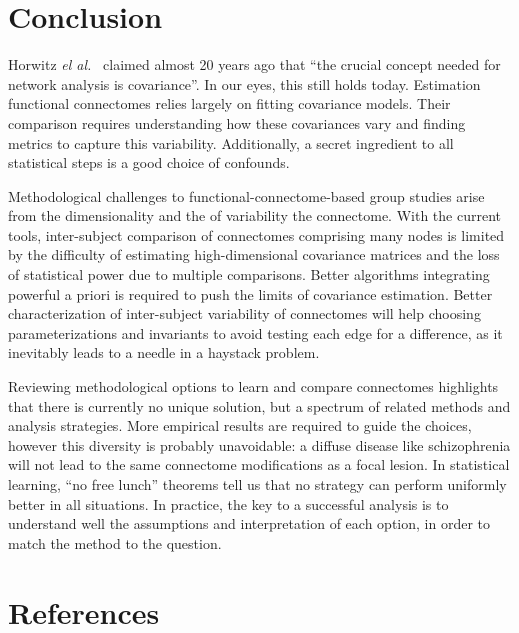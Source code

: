 \documentclass[5p]{elsarticle}
\begin{document}

\section{Conclusion}

Horwitz \emph{el al.}\ \cite{horwitz1995} claimed almost 20 years ago
that ``the crucial concept needed for network analysis is covariance''.
In our eyes, this still holds today. Estimation functional connectomes
relies largely on fitting covariance models. Their comparison requires
understanding how these covariances vary and finding metrics to capture
this variability. Additionally, a secret ingredient to all statistical
steps is a good choice of confounds.

Methodological challenges to functional-connectome-based group studies
arise from the dimensionality and the of variability the connectome. With
the current tools, inter-subject comparison of connectomes comprising
many nodes is limited by the difficulty of estimating high-dimensional
covariance matrices and the loss of statistical power due to multiple
comparisons. Better algorithms integrating powerful a priori is required
to push the limits of covariance estimation. Better characterization of
inter-subject variability of connectomes \cite{kelly2012} will help
choosing parameterizations and invariants to avoid testing each edge for
a difference, as it inevitably leads to a needle in a haystack problem.

Reviewing methodological options to learn and compare connectomes
highlights that there is currently no unique solution, but a spectrum of
related methods and analysis strategies. More empirical results are
required to guide the choices, however this diversity is probably
unavoidable: a diffuse disease like schizophrenia will not lead to the
same connectome modifications as a focal lesion. In statistical learning,
``no free lunch'' theorems \cite{wolpert1996} tell us that no strategy
can perform uniformly better in all situations. In practice, the key to a
successful analysis is to understand well the assumptions and
interpretation of each option, in order to match the method to the
question.

{
\section*{References} \small 
 }

\end{document}
